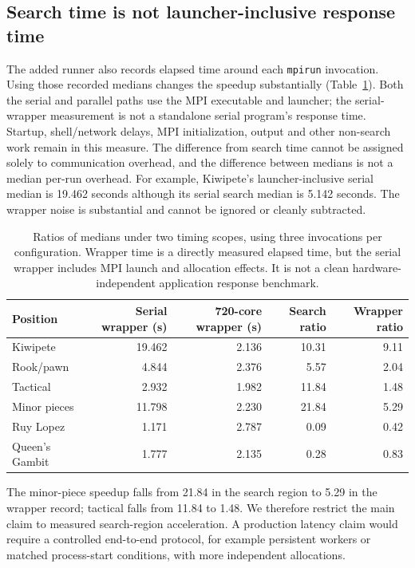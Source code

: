\documentclass[11pt,a4paper]{article}
\newcommand{\code}[1]{\texttt{#1}}
\begin{document}
\subsection{Search time is not launcher-inclusive response time}
The added runner also records elapsed time around each \code{mpirun} invocation.
Using those recorded medians changes the speedup substantially
(Table~\ref{tab:scope}). Both the serial and parallel paths use the MPI executable
and launcher; the serial-wrapper measurement is not a standalone serial program's
response time. Startup, shell/network delays, MPI initialization, output and
other non-search work remain in this measure. The difference from search time
cannot be assigned solely to communication overhead, and the difference between
medians is not a median per-run overhead. For example, Kiwipete's launcher-inclusive
serial median is 19.462 seconds although its serial search median is 5.142 seconds.
The wrapper noise is substantial and cannot be ignored or cleanly subtracted.

\begin{table}[!htbp]\centering\small
\caption{Ratios of medians under two timing scopes, using three invocations
per configuration. Wrapper time is a directly measured elapsed time, but the
serial wrapper includes MPI launch and allocation effects. It is not a clean
hardware-independent application response benchmark.}
\label{tab:scope}
\begin{tabular}{@{}lrrrr@{}}\toprule
Position & Serial wrapper (s) & 720-core wrapper (s) & Search ratio & Wrapper ratio\\\midrule
Kiwipete & 19.462 & 2.136 & 10.31 & 9.11\\
Rook/pawn & 4.844 & 2.376 & 5.57 & 2.04\\
Tactical & 2.932 & 1.982 & 11.84 & 1.48\\
Minor pieces & 11.798 & 2.230 & 21.84 & 5.29\\
Ruy Lopez & 1.171 & 2.787 & 0.09 & 0.42\\
Queen's Gambit & 1.777 & 2.135 & 0.28 & 0.83\\
\bottomrule\end{tabular}\end{table}

The minor-piece speedup falls from 21.84 in the search region to 5.29 in the
wrapper record; tactical falls from 11.84 to 1.48. We therefore restrict the
main claim to measured search-region acceleration. A production latency claim
would require a controlled end-to-end protocol, for example persistent workers
or matched process-start conditions, with more independent allocations.
\end{document}

